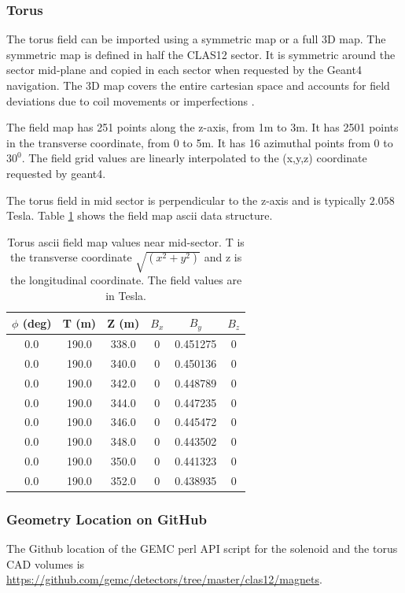\subsubsection{Torus}
The torus field can be imported using a symmetric map or a full 3D map.
The symmetric map is defined in half the CLAS12 sector. It is symmetric around the sector mid-plane and copied in each sector
when requested by the Geant4 navigation. The 3D map covers the entire cartesian space and accounts for field deviations due to coil
movements or imperfections \cite{GhoshalSolenoid}.


The field map has 251 points along the z-axis, from 1m to 3m. It has 2501 points in the transverse coordinate, from 0 to 5m.
It has 16 azimuthal points from $0$ to $30^0$. The field grid values are linearly interpolated to the (x,y,z) coordinate requested by geant4.

The torus field in mid sector is perpendicular to the z-axis and is typically $2.058$ Tesla.
Table \ref{tab:torMap} shows the field map ascii data structure.

\begin{table}[h]
	\begin{center}
		\begin{tabular}{| c | c | c | c | c | c | }
         $\phi$ (deg) & T (m)    & Z (m)    &  $B_x $  &    $B_y$    & $B_z$\\
			\hline
          0.0         &  190.0   &  338.0   &  0       &     0.451275 &  0 \\
          0.0         &  190.0   &  340.0   &  0       &     0.450136 &  0 \\
          0.0         &  190.0   &  342.0   &  0       &     0.448789 &  0 \\
          0.0         &  190.0   &  344.0   &  0       &     0.447235 &  0 \\
          0.0         &  190.0   &  346.0   &  0       &     0.445472 &  0 \\
          0.0         &  190.0   &  348.0   &  0       &     0.443502 &  0 \\
          0.0         &  190.0   &  350.0   &  0       &     0.441323 &  0 \\
          0.0         &  190.0   &  352.0   &  0       &     0.438935 &  0 \\
		\end{tabular}
	\end{center}
	\caption{Torus ascii field map values near mid-sector. T is the transverse coordinate $\sqrt{(x^2+y^2)}$ and z is the longitudinal coordinate.
            The field values are in Tesla.}\label{tab:torMap}
\end{table}


\subsubsection{Geometry Location on GitHub}
The Github location of the GEMC perl API script for the solenoid and the torus CAD volumes is \url{https://github.com/gemc/detectors/tree/master/clas12/magnets}.


